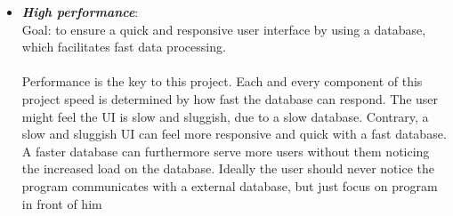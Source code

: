 \begin{itemize}
\item \textit{\bf{High performance}}: 
\\
Goal: to ensure a quick and responsive user interface by using a database, which facilitates fast data processing.  
\\\\
Performance is the key to this project. Each and every component of this project speed is determined by how fast the database can respond. The user might  feel the UI is slow and sluggish, due to a slow database. Contrary, a slow and sluggish UI can feel more responsive and quick with a fast database. A faster database can furthermore serve more users without them noticing the increased load on the database. Ideally the user should never notice the program communicates with a external database, but just focus on program in front of him
\end{itemize}
